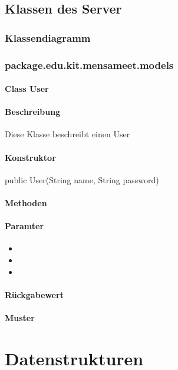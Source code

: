 \documentclass[a4paper]{scrreprt}
\begin{document}
\section{Klassen des Server}
\subsection{Klassendiagramm}
\subsection{package.edu.kit.mensameet.models}
\subsubsection{Class User}
\subsubsection*{Beschreibung}
Diese Klasse beschreibt einen User 

\subsubsection*{Konstruktor}
public User(String name, String password)

\subsubsection*{Methoden}
\begin{addmargin}[25pt]{0pt}

\subsubsection*{Paramter}
\begin{itemize}
\item
\item
\item
\end{itemize}

\subsubsection*{Rückgabewert}
\end{addmargin}
\subsubsection{Muster}


\chapter{Datenstrukturen}
\end{document}
